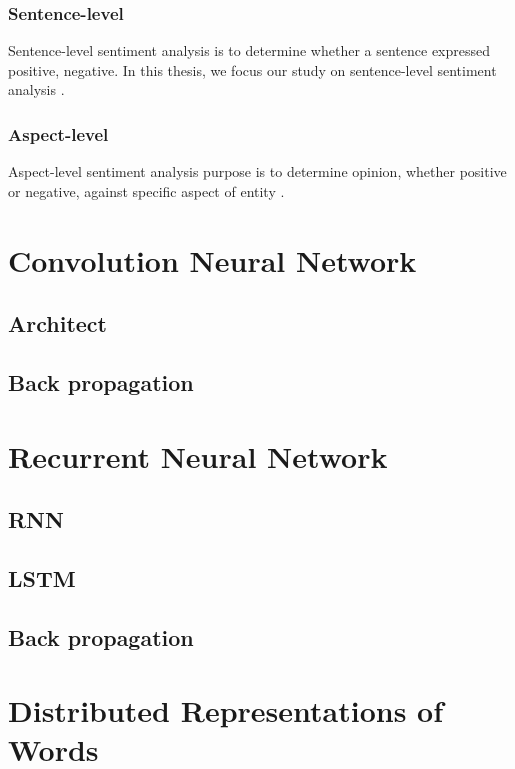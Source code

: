 \subsubsection{Sentence-level}
Sentence-level sentiment analysis is to determine whether a sentence expressed positive, negative. In this thesis, we focus our study on sentence-level sentiment analysis \cite{liu2012sentiment}.
\subsubsection{Aspect-level}
Aspect-level  sentiment analysis purpose is to determine opinion, whether positive or negative, against specific aspect of entity \cite{liu2012sentiment}.



\section{Convolution Neural Network}

\subsection{Architect}

\subsection{Back propagation}

\section{Recurrent Neural Network}

\subsection{RNN}

\subsection{LSTM}

\subsection{Back propagation}

\section{Distributed Representations of Words}
